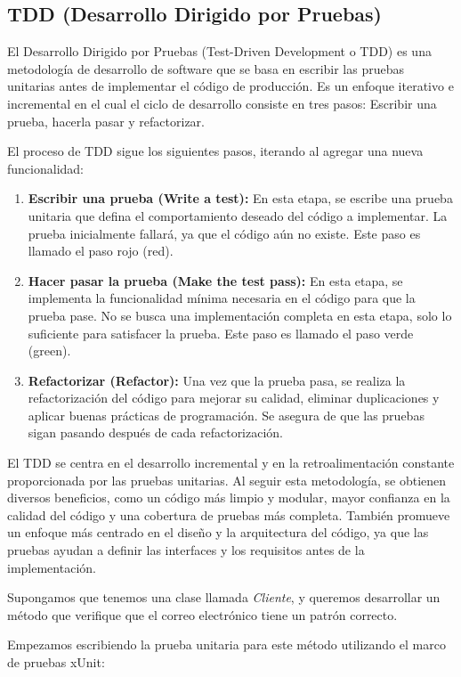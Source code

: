 \documentclass[executivepaper]{article}
\begin{document}
\subsection{TDD (Desarrollo Dirigido por Pruebas)}
El Desarrollo Dirigido por Pruebas (Test-Driven Development o TDD) es una metodología de desarrollo de software que se basa en escribir las pruebas unitarias antes de implementar el código de producción. Es un enfoque iterativo e incremental en el cual el ciclo de desarrollo consiste en tres pasos: Escribir una prueba, hacerla pasar y refactorizar.

El proceso de TDD sigue los siguientes pasos, iterando al agregar una nueva funcionalidad:

\begin{enumerate}
\item \textbf{Escribir una prueba (Write a test):} En esta etapa, se escribe una prueba unitaria que defina el comportamiento deseado del código a implementar. La prueba inicialmente fallará, ya que el código aún no existe. Este paso es llamado el paso rojo (red).
\item \textbf{Hacer pasar la prueba (Make the test pass):} En esta etapa, se implementa la funcionalidad mínima necesaria en el código para que la prueba pase. No se busca una implementación completa en esta etapa, solo lo suficiente para satisfacer la prueba. Este paso es llamado el paso verde (green).
\item \textbf{Refactorizar (Refactor):} Una vez que la prueba pasa, se realiza la refactorización del código para mejorar su calidad, eliminar duplicaciones y aplicar buenas prácticas de programación. Se asegura de que las pruebas sigan pasando después de cada refactorización.
\end{enumerate}

El TDD se centra en el desarrollo incremental y en la retroalimentación constante proporcionada por las pruebas unitarias. Al seguir esta metodología, se obtienen diversos beneficios, como un código más limpio y modular, mayor confianza en la calidad del código y una cobertura de pruebas más completa. También promueve un enfoque más centrado en el diseño y la arquitectura del código, ya que las pruebas ayudan a definir las interfaces y los requisitos antes de la implementación.

Supongamos que tenemos una clase llamada \emph{Cliente}, y queremos desarrollar un método que verifique que el correo electrónico tiene un patrón correcto.

Empezamos escribiendo la prueba unitaria para este método utilizando el marco de pruebas xUnit:
\end{document}
